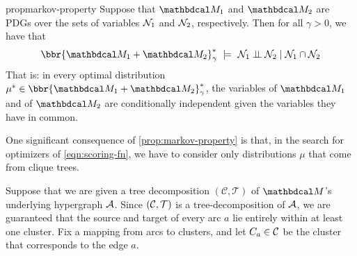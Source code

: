 \documentclass[twoside]{article}
\begin{document}
\begin{linked}{prop}{markov-property}
    Suppose that $\dg M_1$ and $\dg M_2$ are PDGs
    over the sets of variables $\mathcal N_1$ and $\mathcal N_2$, respectively.
	Then for all $\gamma > 0$, we have that
	\[
	 	\bbr{\dg M_1 \bundle \dg M_2}^*_\gamma
			~\models~
		\N_1 \mathbin{\bot\!\!\!\bot} \N_2 \mid \N_1 \cap \N_2
	\]
	That is: in every optimal distribution $\mu^* \in \bbr{\dg M_1 \bundle \dg M_2}^*_\gamma$,
    the variables of $\dg M_1$ and of $\dg M_2$ are conditionally independent given the variables they have in common.
\end{linked}

One significant consequence of \cref{prop:markov-property} is that, in the
search for optimizers of \eqref{eqn:scoring-fn}, we have to
consider only distributions $\mu$ that come from clique trees.

Suppose that we are given a tree decomposition $(\mathcal C, \mathcal T)$
of $\dg M$'s underlying hypergraph $\mathcal A$. 
Since $(\cal C, T)$ is a tree-decomposition of $\mathcal A$, we are guaranteed
that the source and target of every arc $a$ lie entirely within at least one cluster.
Fix a mapping from arcs to clusters, and let $C_a \in \cal C$ be the cluster that corresponds to the edge $a$.
\end{document}
